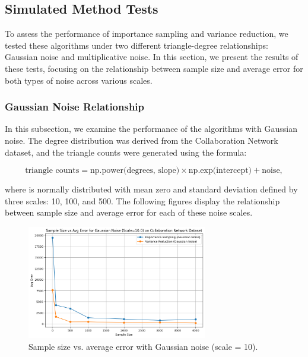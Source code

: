 \documentclass[11pt]{article}
\begin{document}
\subsection{Simulated Method Tests}

To assess the performance of importance sampling and variance reduction, we tested these algorithms under two different triangle-degree relationships: Gaussian noise and multiplicative noise. In this section, we present the results of these tests, focusing on the relationship between sample size and average error for both types of noise across various scales.

\subsubsection{Gaussian Noise Relationship}

In this subsection, we examine the performance of the algorithms with Gaussian noise. The degree distribution was derived from the Collaboration Network dataset, and the triangle counts were generated using the formula:

\[
\text{triangle counts} = \text{np.power(degrees, slope)} \times \text{np.exp(intercept)} + \text{noise},
\]

where  is normally distributed with mean zero and standard deviation defined by three scales: 10, 100, and 500. The following figures display the relationship between sample size and average error for each of these noise scales.

\begin{figure}[H]
    \centering
    \includegraphics[width=0.7\textwidth]{plots/simulated/percent_error_vs_sample_size_comparison_gaussian_10.0.png}
    \caption{Sample size vs. average error with Gaussian noise (scale = 10).}
    \label{fig:gaussian_noise_10}
\end{figure}
\end{document}
